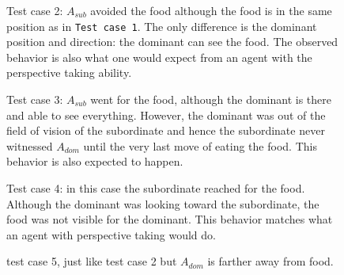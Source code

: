 \documentclass{article}
\begin{document}
\newpage
\begin{figure}[H]
\begin{center}
    \caption{Test  case 2: \(A_{sub}\) avoided the food although the food is in the same position as in \texttt{Test case 1}. The only difference is the dominant position and direction: the dominant can see the food. The observed behavior is also what one would expect from an agent with the perspective taking ability.}
    \label{fig.tc.2}
\end{center}
\end{figure}
\begin{figure}[H]
\begin{center}
\caption{Test  case 3: \(A_{sub}\) went for the food, although the dominant is there and able to see everything. However, the dominant was out of the field of vision of the subordinate and hence the subordinate never witnessed \(A_{dom}\) until the very last move of eating the food. This behavior is also expected to happen.}
\label{fig.tc.3}
\end{center}
\end{figure}
\begin{figure}[H]
\begin{center}
\caption{Test  case 4: in this case the subordinate reached for the food. Although the dominant was looking toward the subordinate, the food was not visible for the dominant. This behavior matches what an agent with perspective taking would do.}
\label{fig.tc.4}
\end{center}
\end{figure}
\begin{figure}[H]
\begin{center}
\caption{test case 5, just like test case 2 but \(A_{dom}\) is farther away from food.}
\label{fig.tc.5}
\end{center}
\end{figure}
\end{document}
